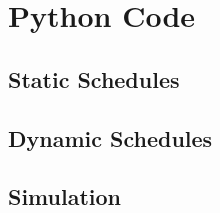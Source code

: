 \chapter{Python Code}
\section{Static Schedules}


\newpage

\section{Dynamic Schedules}


\newpage

\section{Simulation}


















































